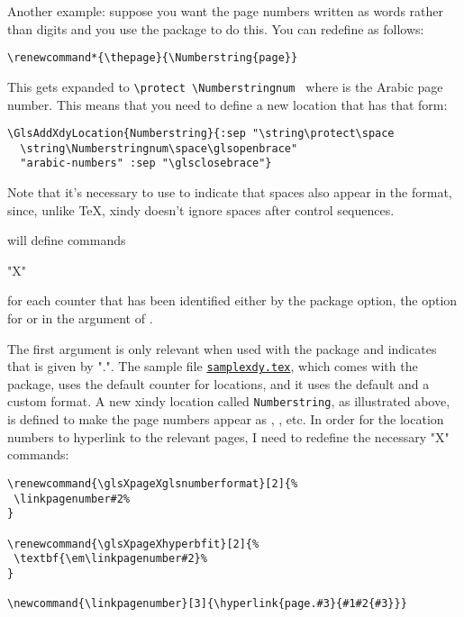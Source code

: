 \documentclass{nlctdoc}
\newcommand*{\samplefile}[1]{\hyperref[ex:sample#1]{\texttt{sample#1.tex}}}
\begin{document}
Another example: suppose you want the page numbers written as words
rather than digits and you use the  package to
do this. You can redefine  as follows:
\begin{verbatim}
\renewcommand*{\thepage}{\Numberstring{page}}
\end{verbatim}
This gets expanded to \verb|\protect \Numberstringnum |
where  is the Arabic page number. This means that you need to
define a new location that has that form:
\begin{verbatim}
\GlsAddXdyLocation{Numberstring}{:sep "\string\protect\space
  \string\Numberstringnum\space\glsopenbrace"
  "arabic-numbers" :sep "\glsclosebrace"}
\end{verbatim}
Note that it's necessary to use  to indicate that 
spaces also appear in the format, since, unlike \TeX,
\gls{xindy} doesn't ignore spaces after control sequences.

 will define commands
\begin{definition}
"X"
\end{definition}
for each counter that has been identified either by the
 package option, the  option for
 or in the argument of .

The first argument  is only relevant when used with
the  package and indicates that 
is given by ".". The sample
file \samplefile{xdy}, which comes with the 
package, uses the default  counter for locations, and it
uses the default  and a custom 
format. A new \gls{xindy} location called \texttt{Numberstring}, as
illustrated above, is defined to make the page numbers appear as
, , etc. In order for the location numbers to
hyperlink to the relevant pages, I need to redefine the necessary
"X" commands:
\begin{verbatim}
\renewcommand{\glsXpageXglsnumberformat}[2]{%
 \linkpagenumber#2%
}

\renewcommand{\glsXpageXhyperbfit}[2]{%
 \textbf{\em\linkpagenumber#2}%
}

\newcommand{\linkpagenumber}[3]{\hyperlink{page.#3}{#1#2{#3}}}
\end{verbatim}
\end{document}
